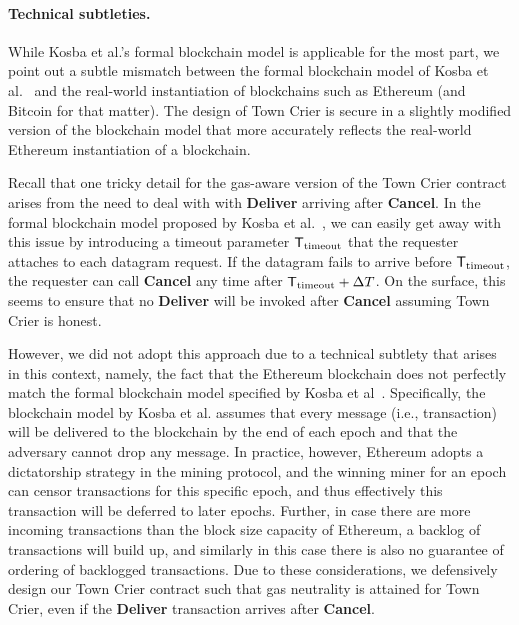 \newcommand{\Ttimeout}{\ensuremath{{\sf T}_{\text{timeout}}}\xspace}

\paragraph{Technical subtleties.}
While Kosba et al.'s formal blockchain model is applicable for the most part,
we point out a subtle mismatch
between the formal blockchain model of
Kosba et al.~\cite{hawk} and
the real-world instantiation of blockchains such as 
Ethereum (and Bitcoin for that matter).
The design of Town Crier is secure in a slightly modified
version of the blockchain model that more accurately reflects
the real-world Ethereum instantiation of a blockchain.


Recall that one tricky detail for the gas-aware version of the Town Crier 
contract arises from the need to deal with  
with {\bf Deliver}
arriving after {\bf Cancel}.
In the formal blockchain model
proposed by Kosba et al.~\cite{hawk}, we can easily get away with this issue 
by introducing 
a timeout parameter
$\Ttimeout$ that the requester attaches to each datagram request. 
If the datagram fails to arrive before $\Ttimeout$, 
the requester can call {\bf Cancel}
any time after 
$\Ttimeout + \Delta T$.  
On the surface, this 
seems to ensure that no {\bf Deliver} will be invoked
after {\bf Cancel} assuming Town Crier is honest. 

However, we did not adopt this approach due to a technical subtlety
that arises in this context, namely, the fact that  
the Ethereum blockchain does not  
perfectly match the formal blockchain 
model specified by Kosba et al~\cite{hawk}.
Specifically, the blockchain model by Kosba et al.
assumes that every message (i.e., transaction) will be delivered 
to the blockchain 
by the end of each epoch and that the adversary cannot drop
any message.
In practice, however, 
Ethereum adopts a dictatorship 
strategy in the mining protocol, and the winning miner 
for an epoch can censor transactions for this specific epoch, and thus
effectively this transaction will be deferred to later epochs.
Further, in case there are more incoming transactions than the block size
capacity of Ethereum, a backlog of transactions will build up, 
and similarly in this case there is also no guarantee of 
ordering of backlogged transactions.
Due to these considerations, we defensively design our Town Crier contract
such that gas neutrality is attained for Town Crier,
even if the {\bf Deliver} transaction arrives after {\bf Cancel}.







